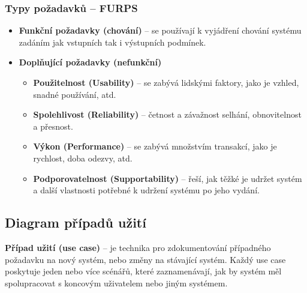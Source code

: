 \subsubsection{Typy požadavků -- FURPS}
\begin{itemize}
\item \textbf{Funkční požadavky (chování)} -- se používají k vyjádření chování systému zadáním jak vstupních tak i výstupních podmínek.
\item \textbf{Doplňující požadavky (nefunkční)}
\begin{itemize}
\item \textbf{Použitelnost (Usability)} -- se zabývá lidskými faktory, jako je vzhled, snadné používání, atd.
\item \textbf{Spolehlivost (Reliability)} --  četnost a závažnost selhání, obnovitelnost a přesnost.
\item \textbf{Výkon (Performance)} -- se zabývá množstvím transakcí, jako je rychlost, doba odezvy, atd.
\item \textbf{Podporovatelnost (Supportability)} -- řeší, jak těžké je udržet systém a další vlastnosti potřebné k udržení systému po jeho vydání.
\end{itemize}
\end{itemize}

\subsection{Diagram případů užití}
\textbf{Případ užití (use case)} -- je technika pro zdokumentování případného požadavku na nový systém, nebo změny na stávající systém. Každý use case poskytuje jeden nebo více scénářů, které zaznamenávají, jak by systém měl spolupracovat s koncovým uživatelem nebo jiným systémem.

